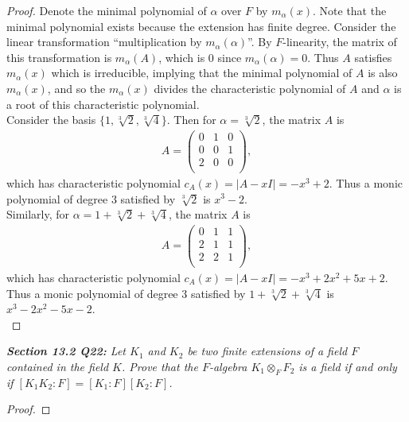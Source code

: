 \documentclass{article}
\begin{document}
  \begin{proof}
    Denote the minimal polynomial of $\alpha$ over $F$ by $m_\alpha(x)$.
    Note that the minimal polynomial exists because the extension has
    finite degree. Consider the linear transformation ``multiplication by
    $m_\alpha(\alpha)$''. By $F$-linearity, the matrix of this
    transformation is $m_\alpha(A)$, which is 0 since $m_\alpha(\alpha)=0$.
    Thus $A$ satisfies $m_\alpha(x)$ which is irreducible, implying that
    the minimal polynomial of $A$ is also $m_\alpha(x)$, and so the
    $m_\alpha(x)$ divides the characteristic polynomial of $A$ and $\alpha$
    is a root of this characteristic polynomial. \\

    Consider the basis $\{1,\sqrt[3]{2},\sqrt[3]{4}\}$. Then for
    $\alpha=\sqrt[3]{2}$, the matrix $A$ is
    \begin{align*}
      A =
      \begin{pmatrix}
        0&1&0\\
        0&0&1\\
        2&0&0\\
      \end{pmatrix},
    \end{align*}
    which has characteristic polynomial $c_A(x)=|A-xI|=-x^3+2$. Thus a
    monic polynomial of degree 3 satisfied by $\sqrt[3]{2}$ is $x^3-2$. \\

    Similarly, for $\alpha=1+\sqrt[3]{2}+\sqrt[3]{4}$, the matrix $A$ is
    \begin{align*}
      A =
      \begin{pmatrix}
        0&1&1\\
        2&1&1\\
        2&2&1\\
      \end{pmatrix},
    \end{align*}
    which has characteristic polynomial $c_A(x)=|A-xI|=-x^3+2x^2+5x+2$.
    Thus a monic polynomial of degree 3 satisfied by
    $1+\sqrt[3]{2}+\sqrt[3]{4}$ is $x^3-2x^2-5x-2$. \\
  \end{proof}

\it \textbf{Section 13.2 Q22:} Let $K_1$ and $K_2$ be two finite extensions
  of a field $F$ contained in the field $K$. Prove that the $F$-algebra
  $K_1\otimes_F F_2$ is a field if and only if $[K_1K_2:F]=[K_1:F][K_2:F]$.

  \begin{proof}
  \end{proof}
\end{document}

